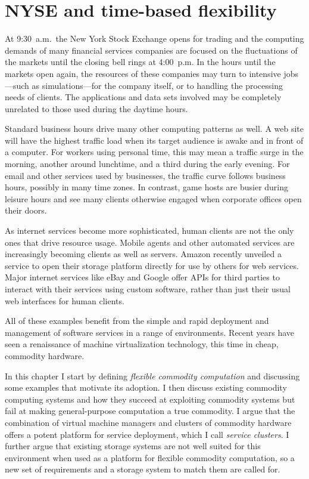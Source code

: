\section{NYSE and time-based flexibility}

At 9:30~a.m.\ the New York Stock Exchange opens for trading and the computing demands of many financial services companies are focused on the fluctuations of the markets until the closing bell rings at 4:00~p.m. In the hours until the markets open again, the resources of these companies may turn to intensive jobs---such as simulations---for the company itself, or to handling the processing needs of clients. The applications and data sets involved may be completely unrelated to those used during the daytime hours.

Standard business hours drive many other computing patterns as well. A web site will have the highest traffic load when its target audience is awake and in front of a computer. For workers using personal time, this may mean a traffic surge in the morning, another around lunchtime, and a third during the early evening. For email and other services used by businesses, the traffic curve follows business hours, possibly in many time zones. In contrast, game hosts are busier during leisure hours and see many clients otherwise engaged when corporate offices open their doors.

As internet services become more sophisticated, human clients are not the only ones that drive resource usage. Mobile agents and other automated services are increasingly becoming clients as well as servers. Amazon recently unveiled a service to open their storage platform directly for use by others for web services. Major internet services like eBay and Google offer APIs for third parties to interact with their services using custom software, rather than just their usual web interfaces for human clients.

All of these examples benefit from the simple and rapid deployment and management of software services in a range of environments. Recent years have seen a renaissance of machine virtualization technology, this time in cheap, commodity hardware.

In this chapter I start by defining \emph{flexible commodity computation} and discussing some examples that motivate its adoption. I then discuss existing commodity computing systems and how they succeed at exploiting commodity systems but fail at making general-purpose computation a true commodity. I argue that the combination of virtual machine managers and clusters of commodity hardware offers a potent platform for service deployment, which I call \emph{service clusters}. I further argue that existing storage systems are not well suited for this environment when used as a platform for flexible commodity computation, so a new set of requirements and a storage system to match them are called for.

